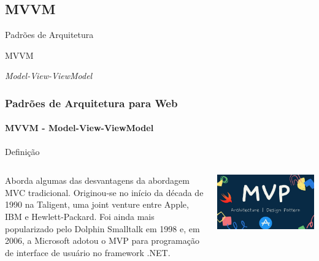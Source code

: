 \documentclass[
	10pt, %
	t, %
]{beamer}
\begin{document}

\subsection{MVVM}

\begin{frame}
	\begin{center}
		
		\bigskip\bigskip\bigskip\bigskip %
		{\Large Padrões de Arquitetura}
		
		\bigskip\bigskip %
		{\Huge MVVM}
		
		\smallskip
		{\small \textit{Model-View-ViewModel}}
	\end{center}

\end{frame}

\begin{frame}
	\frametitle{Padrões de Arquitetura para Web}
	\framesubtitle{MVVM - Model-View-ViewModel}

	\begin{block}{Definição}
	\begin{columns}[c] %
			\begin{column}{0.8\textwidth} %
				Aborda algumas das desvantagens da abordagem MVC tradicional. Originou-se no início da década de 1990 na Taligent, uma joint venture entre Apple, IBM e Hewlett-Packard. Foi ainda mais popularizado pelo Dolphin Smalltalk em 1998 e, em 2006, a Microsoft adotou o MVP para programação de interface de usuário no framework .NET.
			\end{column}

			\begin{column}{0.2\textwidth} %
				\includegraphics[width=0.9\linewidth]{Images/mvp_logo.jpg}
			\end{column}
		\end{columns}
	\end{block}

\end{frame}
\end{document}
